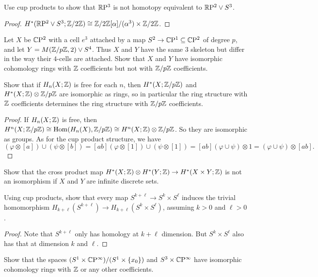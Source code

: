 \begin{exercise}
Use cup products to show that $\mathbb{R}\mathrm{P}^3$ is not homotopy equivalent to $\mathbb{R}\mathrm{P}^2\vee S^3$.
\end{exercise}
\begin{proof}
$H^*(\mathbb{R}\mathrm{P}^2\vee S^3;\mathbb{Z}/2\mathbb{Z})\cong \mathbb{Z}/2\mathbb{Z}[\alpha]/(\alpha^3)\times\mathbb{Z}/2\mathbb{Z}$.
\end{proof}
\begin{exercise}
Let $X$ be $\mathbb{C}\mathrm{P}^2$ with a cell $e^3$ attached by a map $S^2\to\mathbb{C}\mathrm{P}^1\subseteq\mathbb{C}\mathrm{P}^2$ of degree $p$, and let $Y=M(\mathbb{Z}/p\mathbb{Z},2)\vee S^4$. Thus $X$ and $Y$ have the same $3$ skeleton but differ in the way their $4$-cells are attached. Show that $X$ and $Y$ have isomorphic cohomology rings with $\mathbb{Z}$ coefficients but not with $\mathbb{Z}/p\mathbb{Z}$ coefficients.
\end{exercise}
\begin{exercise}
Show that if $H_n(X;\mathbb{Z})$ is free for each $n$, then $H^*(X;\mathbb{Z}/p\mathbb{Z})$ and $H^*(X;\mathbb{Z})\otimes\mathbb{Z}/p\mathbb{Z}$ are isomorphic as rings, so in particular the ring structure with $\mathbb{Z}$ coefficients determines the ring structure with $\mathbb{Z}/p\mathbb{Z}$ coefficients.
\end{exercise}
\begin{proof}
If $H_n(X;\mathbb{Z})$ is free, then $H^n(X;\mathbb{Z}/p\mathbb{Z})\cong \mathrm{Hom}(H_n(X),\mathbb{Z}/p\mathbb{Z})\cong H^n(X;\mathbb{Z})\otimes\mathbb{Z}/p\mathbb{Z}$. So they are isomorphic as groups. As for the cup product structure, we have
\[(\varphi\otimes[a])\cup(\psi\otimes[b])=[ab](\varphi\otimes[1])\cup(\psi\otimes[1])=[ab](\varphi\cup\psi)\otimes 1=(\varphi\cup\psi)\otimes[ab].\]
\end{proof}
\begin{exercise}
Show that the cross product map $H^*(X;\mathbb{Z})\otimes H^*(Y;\mathbb{Z})\to H^*(X\times Y;\mathbb{Z})$ is not an isomorphism if $X$ and $Y$ are infinite discrete sets.
\end{exercise}
\begin{exercise}
Using cup products, show that every map $S^{k+\ell}\to S^k\times S^\ell$ induces the trivial homomorphism $H_{k+\ell}(S^{k+\ell})\to H_{k+\ell}(S^k\times S^\ell)$, assuming $k>0$ and $\ell>0$.
\end{exercise}
\begin{proof}
Note that $S^{k+\ell}$ only has homology at $k+\ell$ dimension. But $S^k\times S^\ell$ also has that at dimension $k$ and $\ell$.
\end{proof}
\begin{exercise}
Show that the spaces $(S^1\times\mathbb{C}\mathrm{P}^\infty)/(S^1\times\{x_0\})$ and $S^3\times\mathbb{C}\mathrm{P}^\infty$ have isomorphic cohomology rings with $\mathbb{Z}$ or any other coefficients.
\end{exercise}
